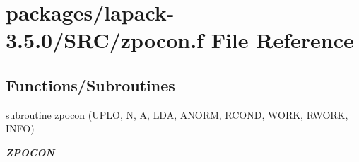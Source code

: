 \hypertarget{zpocon_8f}{}\section{packages/lapack-\/3.5.0/\+S\+R\+C/zpocon.f File Reference}
\label{zpocon_8f}
\subsection*{Functions/\+Subroutines}
\begin{DoxyCompactItemize}
\item 
subroutine \hyperlink{group__complex16POcomputational_gaa3938ab5d7bc02f1d7115794d242b7d0}{zpocon} (U\+P\+L\+O, \hyperlink{polmisc_8c_a0240ac851181b84ac374872dc5434ee4}{N}, \hyperlink{classA}{A}, \hyperlink{example__user_8c_ae946da542ce0db94dced19b2ecefd1aa}{L\+D\+A}, A\+N\+O\+R\+M, \hyperlink{superlu__enum__consts_8h_af00a42ecad444bbda75cde1b64bd7e72a9b5c151728d8512307565994c89919d5}{R\+C\+O\+N\+D}, W\+O\+R\+K, R\+W\+O\+R\+K, I\+N\+F\+O)
\begin{DoxyCompactList}\small\item\em {\bfseries Z\+P\+O\+C\+O\+N} \end{DoxyCompactList}\end{DoxyCompactItemize}
